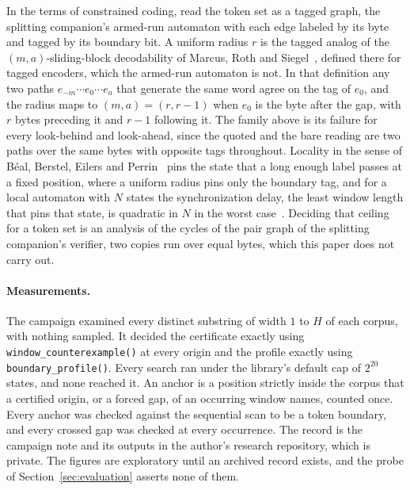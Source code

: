 \documentclass[11pt,a4paper]{article}
\theoremstyle{definition}
\theoremstyle{plain}
\newcommand{\code}[1]{\texttt{#1}}
\begin{document}
In the terms of constrained coding, read the token set as a tagged graph, the splitting companion's armed-run automaton
with each edge labeled by its byte and tagged by its boundary bit. A uniform radius $r$ is the tagged analog of the
$(m, a)$-sliding-block decodability of Marcus, Roth and Siegel~\cite[Section~4.3]{marcus2001constrained}, defined there
for tagged encoders, which the armed-run automaton is not. In that definition any two paths
$e_{-m} \cdots e_0 \cdots e_a$ that generate the same word agree on the tag of $e_0$, and the radius maps to
$(m, a) = (r, r - 1)$ when $e_0$ is the byte after the gap, with $r$ bytes preceding it and $r - 1$ following it. The
family above is its failure for every look-behind and look-ahead, since the quoted and the bare reading are two paths
over the same bytes with opposite tags throughout. Locality in the sense of B\'eal, Berstel, Eilers and
Perrin~\cite[Section~6.1]{beal2021symbolic} pins the state that a long enough label passes at a fixed position, where a
uniform radius pins only the boundary tag, and for a local automaton with $N$ states the synchronization delay, the
least window length that pins that state, is quadratic in $N$ in the worst case~\cite{beal1998synchronization}. Deciding
that ceiling for a token set is an analysis of the cycles of the pair graph of the splitting companion's verifier, two
copies run over equal bytes, which this paper does not carry out.

\paragraph{Measurements.} The campaign examined every distinct substring of width $1$ to $H$ of each corpus, with
nothing sampled. It decided the certificate exactly using \code{window\_counterexample()} at every origin and the
profile exactly using \code{boundary\_profile()}. Every search ran under the library's default cap of $2^{20}$ states,
and none reached it. An anchor is a position strictly inside the corpus that a certified origin, or a forced gap, of an
occurring window names, counted once. Every anchor was checked against the sequential scan to be a token boundary, and
every crossed gap was checked at every occurrence. The record is the campaign note
 and its outputs  in the author's
research repository, which is private. The figures are exploratory until an archived record exists, and the probe of
Section~\ref{sec:evaluation} asserts none of them.
\end{document}
